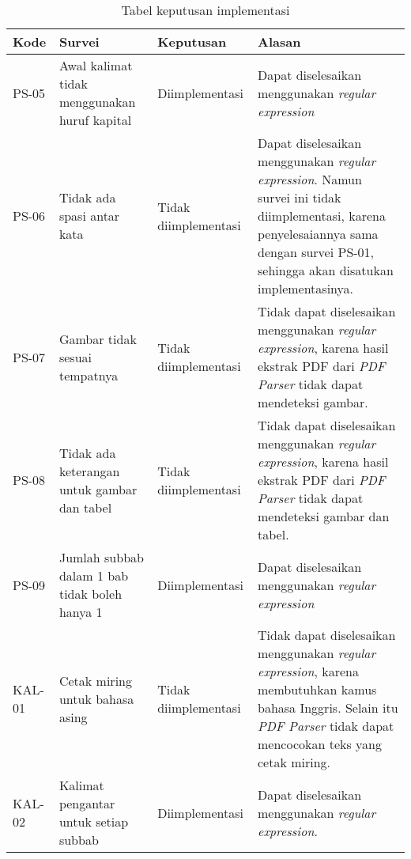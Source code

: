 \begin{table}[H]
	\caption {Tabel keputusan implementasi} \label{tab:keputusan2}
	\begin{center}
		\begin{tabular}{|p{1.5 cm}|>{\raggedright} p{4 cm}| p{2.5 cm}| p{6.5 cm}|}
		\hline
		Kode & Survei & Keputusan & Alasan \\ 
		\hline 
		PS-05 & Awal kalimat tidak menggunakan huruf kapital & Diimplementasi & Dapat diselesaikan menggunakan \textit{regular expression} \newline \\ 
		\hline
		PS-06 & Tidak ada spasi antar kata & Tidak \newline diimplementasi & Dapat diselesaikan menggunakan \textit{regular expression}. Namun survei ini tidak
diimplementasi, karena penyelesaiannya sama dengan survei PS-01, sehingga akan disatukan implementasinya. \newline \\ 
		\hline 
		PS-07 & Gambar tidak sesuai tempatnya & Tidak \newline diimplementasi & Tidak dapat diselesaikan menggunakan \textit{regular expression}, karena hasil ekstrak PDF dari \textit{PDF Parser} tidak dapat mendeteksi gambar. \newline \\ 
		\hline 
		PS-08 & Tidak ada keterangan untuk gambar dan tabel & Tidak \newline diimplementasi & Tidak dapat diselesaikan menggunakan \textit{regular expression}, karena hasil ekstrak PDF dari \textit{PDF Parser} tidak dapat mendeteksi gambar dan tabel. \newline \\ 
		\hline 
		PS-09 & Jumlah subbab dalam 1 bab tidak boleh hanya 1 & Diimplementasi & Dapat diselesaikan menggunakan \textit{regular expression} \newline \\ 
		\hline 
		KAL-01 & Cetak miring untuk bahasa asing & Tidak \newline diimplementasi & Tidak dapat diselesaikan menggunakan \textit{regular expression}, karena membutuhkan kamus bahasa Inggris. Selain itu \textit{PDF Parser} tidak dapat mencocokan teks yang cetak miring. \newline \\ 
		\hline 
		KAL-02 & Kalimat pengantar untuk setiap subbab & Diimplementasi & Dapat diselesaikan menggunakan \textit{regular expression}. \newline \\ 

\end{tabular}
\end{center}
\end{table}
